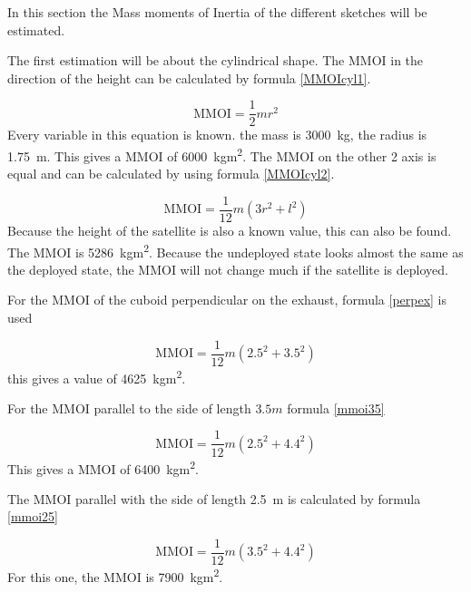 

In this section the Mass moments of Inertia of the different sketches
will be estimated.


The first estimation will be about the cylindrical shape. The MMOI in
the direction of the height can be calculated by formula
\ref{MMOIcyl1}.

\begin{equation}
  \label{MMOIcyl1}
  \mathrm{MMOI}=\frac{1}{2}mr^2
\end{equation}
Every variable in this equation is known. the mass is \SI{3000}{kg},
the radius is \SI{1.75}{m}. This gives a MMOI of \SI{6000}{kgm^2}. The
MMOI on the other 2 axis is equal and can be calculated by using
formula \ref{MMOIcyl2}.

\begin{equation}
  \label{MMOIcyl2}
  \mathrm{MMOI}=\frac{1}{12}m(3r^2+l^2)
\end{equation}
Because the height of the satellite is also a known value, this can
also be found.  The MMOI is \SI{5286}{kgm^2}. Because the undeployed
state looks almost the same as the deployed state, the MMOI will not
change much if the satellite is deployed.


For the MMOI of the cuboid perpendicular on the exhaust, formula
\ref{perpex} is used

\begin{equation}
  \label{perpex}
  \mathrm{MMOI}=\frac{1}{12}m(2.5^2+3.5^2)
\end{equation}
this gives a value of \SI{4625}{kgm^2}.

For the MMOI parallel to the side of length $3.5m$ formula \ref{mmoi35}

\begin{equation}
  \label{mmoi35}
  \mathrm{MMOI}=\frac{1}{12}m(2.5^2+4.4^2)
\end{equation}
This gives a MMOI of \SI{6400}{kgm^2}.

The MMOI parallel with the side of length \SI{2.5}{m} is calculated by
formula \ref{mmoi25}

\begin{equation}
  \label{mmoi25}
  \mathrm{MMOI}=\frac{1}{12}m(3.5^2+4.4^2)
\end{equation}
For this one, the MMOI is \SI{7900}{kgm^2}.

